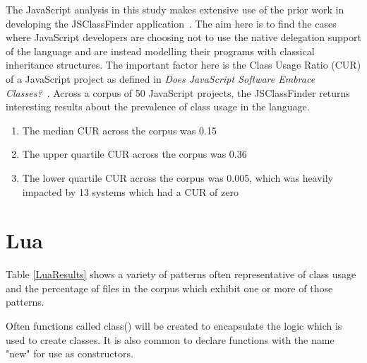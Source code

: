 The JavaScript analysis in this study makes extensive use of the prior work in developing the JSClassFinder application~\cite{JSClassFinder}. The aim here is to find the cases where JavaScript developers are choosing not to use the native delegation support of the language and are instead modelling their programs with classical inheritance structures. The important factor here is the Class Usage Ratio (CUR) of a JavaScript project as defined in \textit{Does JavaScript Software Embrace Classes?~\cite{JSClassFinder}}. Across a corpus of 50 JavaScript projects, the JSClassFinder returns interesting results about the prevalence of class usage in the language.
\begin{enumerate}
	\item The median CUR across the corpus was 0.15
	\item The upper quartile CUR across the corpus was 0.36
	\item The lower quartile CUR across the corpus was 0.005, which was heavily impacted by 13 systems which had a CUR of zero
\end{enumerate}
\section{Lua}
Table \ref{LuaResults} shows a variety of patterns often representative of class usage and the percentage of files in the corpus which exhibit one or more of those patterns.\newline

Often functions called class() will be created to encapsulate the  logic which is used to create classes. It is also common to declare functions with the name "new" for use as constructors.

